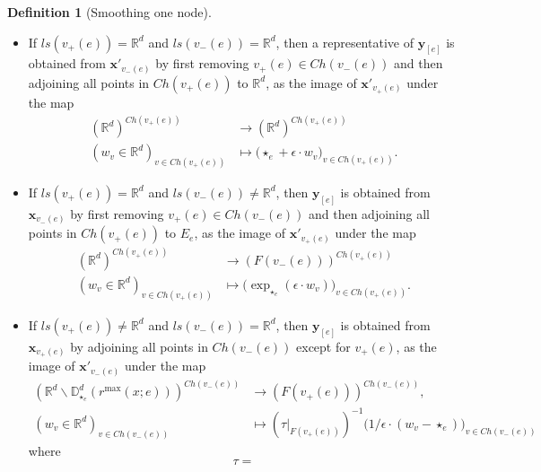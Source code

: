 \documentclass[11pt]{article}
\theoremstyle{definition}
\newtheorem{dfn}[thm]{Definition}
\theoremstyle{remark}
\def\R{\mathbb{R}}
\def\D{\mathbb{D}}
\def\rI{{\mathring{I}}}
\def\Ch{{{Ch}}}
\def\bx{\mathbf{x}}
\def\by{\mathbf{y}}
\begin{document}
\begin{dfn}[Smoothing one node]
\begin{itemize}
\item[(a)]
If $ls(v_+(e))=\R^d$ and $ls(v_-(e))=\R^d$, 
then a representative of $\by_{[e]}$ is obtained from $\bx'_{v_-(e)}$ by first removing $v_+(e)\in \Ch(v_-(e))$ and then adjoining all points in $\Ch(v_+(e))$ to $\R^d$, as the image of $\bx'_{v_+(e)}$ under the map
\begin{align*}
(\R^d)^{\Ch(v_+(e))}&\longrightarrow(\R^d)^{\Ch(v_+(e))}\\
(w_v\in\R^d)_{v\in \Ch(v_+(e))}&\longmapsto\big(\star_e  + \epsilon\cdot w_v\big)_{v\in \Ch(v_+(e))}.
\end{align*}
\item[(b)]
If $ls(v_+(e))=\R^d$ and $ls(v_-(e))\neq\R^d$,
then $\by_{[e]}$ is obtained from $\bx_{v_-(e)}$ by first removing $v_+(e)\in \Ch(v_-(e))$ and then adjoining all points in $\Ch(v_+(e))$ to $E_e$, as the image of $\bx'_{v_+(e)}$ under the map
\begin{align*}
(\R^d)^{\Ch(v_+(e))}&\longrightarrow(F(v_-(e)))^{\Ch(v_+(e))}\\
(w_v\in\R^d)_{v\in \Ch(v_+(e))}&\longmapsto \big(\exp_{\star_e}(\epsilon\cdot w_v)\big)_{v\in \Ch(v_+(e))}.
\end{align*}
\item[(c)] 
If $ls(v_+(e))\neq \R^d$ and
$ls(v_-(e))=\R^d$, 
then $\by_{[e]}$ is obtained from $\bx_{v_+(e)}$ by adjoining all points in $\Ch(v_-(e))$ except for $v_+(e)$,
as the image of $\bx'_{v_-(e)}$ under the map
\begin{align*}
(\R^d\backslash\D^d_{\star_e}(r^{\max}(x;e)))^{\Ch(v_-(e))}&\longrightarrow(F(v_+(e)))^{\Ch(v_-(e))},\\
(w_v\in\R^d)_{v\in \Ch(v_-(e))}&\longmapsto (\tau|_{F(v_+(e))})^{-1}\big(1/\epsilon\cdot(w_v-\star_e)\big)_{v\in \Ch(v_-(e))}
\end{align*}
where 
\[
\tau=
\]
\end{itemize}
\end{dfn}
\end{document}
